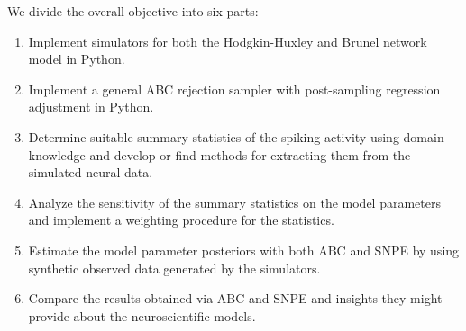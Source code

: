 We divide the overall objective into six parts:
\begin{enumerate}
    \item Implement simulators for both the Hodgkin-Huxley and Brunel network model in Python. 
    \item Implement a general ABC rejection sampler with post-sampling regression adjustment in Python.
    \item Determine suitable summary statistics of the spiking activity using domain knowledge and develop or find methods for extracting them from the simulated neural data. 
    \item Analyze the sensitivity of the summary statistics on the model parameters and implement a weighting procedure for the statistics. 
    \item Estimate the model parameter posteriors with both ABC and SNPE by using synthetic observed data generated by the simulators. 
    \item Compare the results obtained via ABC and SNPE and insights they might provide about the neuroscientific models. 
\end{enumerate}



